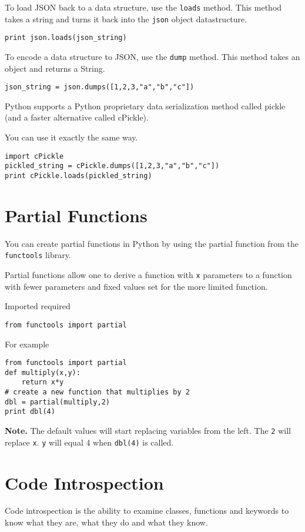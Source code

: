 \documentclass[a4paper,oneside]{book}
\numberwithin{equation}{chapter}
\begin{document}
To load JSON back to a data structure, use the \texttt{loads} method. This method takes a string and turns it back into the \texttt{json} object datastructure.
\begin{verbatim}
print json.loads(json_string)
\end{verbatim}

To encode a data structure to JSON, use the \texttt{dump} method. This method takes an object and returns a String.
\begin{verbatim}
json_string = json.dumps([1,2,3,"a","b","c"])
\end{verbatim}

Python supports a Python proprietary data serialization method called pickle (and a faster alternative called cPickle).

You can use it exactly the same way.
\begin{verbatim}
import cPickle
pickled_string = cPickle.dumps([1,2,3,"a","b","c"])
print cPickle.loads(pickled_string)
\end{verbatim}
\section{Partial Functions}
You can create partial functions in Python by using the partial function from the \texttt{functools} library.

Partial functions allow one to derive a function with \texttt{x} parameters to a function with fewer parameters and fixed values set for the more limited function.

Imported required
\begin{verbatim}
from functools import partial
\end{verbatim}

For example
\begin{verbatim}
from functools import partial
def multiply(x,y):
    return x*y
# create a new function that multiplies by 2
dbl = partial(multiply,2)
print dbl(4)
\end{verbatim}
\textbf{Note.} The default values will start replacing variables from the left. The \texttt{2} will replace \texttt{x}. \texttt{y} will equal 4 when \texttt{dbl(4)} is called.
\section{Code Introspection}
Code introspection is the ability to examine classes, functions and keywords to know what they are, what they do and what they know.
\end{document}
